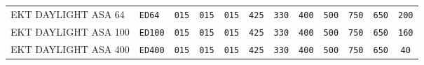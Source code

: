 \begin{table}[htb]
\begin{center}
\begin{tabular}{|l|l|c|c|c|c|c|c|c|c|c|c|}
{EKT \scriptsize DAYLIGHT ASA 64} & {\tt ED64} & {\tt 015} & {\tt 015} &
{\tt 015} & {\tt 425} & {\tt 330} & {\tt 400} & {\tt 500} & {\tt 750} &
{\tt 650} & {\tt 200} \\

%
%
%
{EKT \scriptsize DAYLIGHT ASA 100} & {\tt ED100} & {\tt 015} & {\tt 015} &
{\tt 015} & {\tt 425} & {\tt 330} & {\tt 400} & {\tt 500} & {\tt 750} &
{\tt 650} & {\tt 160} \\

{EKT \scriptsize DAYLIGHT ASA 400} & {\tt ED400} & {\tt 015} & {\tt 015} &
{\tt 015} & {\tt 425} & {\tt 330} & {\tt 400} & {\tt 500} & {\tt 750} &
{\tt 650} & {\tt 40} \\


\end{tabular}
\end{center}
\end{table}
